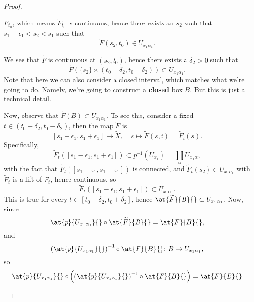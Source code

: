 \begin{proof}
\begin{enumerate}
		      \(F_{t_0}\), which means \(\widetilde{F} _{t_0}\) is continuous, hence there exists an \(s_{2} \) such that \(s_{1}-\epsilon _1<s_{2}< s_1  \) such that
		      \[
			      \widetilde{F} (s_2, t_0)\in U_{x_1 \alpha _1}.
		      \]
		      \begin{figure}[H]
			      \centering
			      \label{fig:pf:col:lec14-8}
		      \end{figure}
		      We see that \(\widetilde{F} \) is continuous at \((s_2, t_0)\), hence there exists a \(\delta _2>0\) such that
		      \[
			      \widetilde{F} \left(\{s_2\}\times (t_0 - \delta _2, t_0 + \delta_2)\right)\subset U_{x_1\alpha _1}.
		      \]
		      Note that here we can also consider a closed interval, which matches what we're going to do. Namely, we're going to construct a
		      \textbf{closed} box \(B\). But this is just a technical detail.
		      \begin{figure}[H]
			      \centering
			      \label{fig:pf:col:lec14-9}
		      \end{figure}
		      Now, observe that \(\widetilde{F} (B)\subset U_{x_1 \alpha _1}\). To see this, consider a fixed \(t\in (t_0 + \delta _2, t_0 - \delta _2)\), then the map \(\widetilde{F} \) is
		      \[
			      [s_{1}-\epsilon _1, s_{1}+\epsilon _1]\to \widetilde{X} ,\quad s\mapsto \widetilde{F} (s, t) = \widetilde{F} _{t} (s).
		      \]
		      Specifically,
		      \[
			      \widetilde{F} _{t} ([s_{1}-\epsilon _1, s_{1}+\epsilon _1]) \subset p^{-1} (U_{x_1}) = \coprod\limits_{\alpha}U_{x_1 \alpha },
		      \]
		      with the fact that \(\widetilde{F} _{t} ([s_{1}-\epsilon _1, s_{1}+\epsilon _1])\) is connected, and \(\widetilde{F} _{t} (s_2)\in U_{x_1 \alpha _1}\) with
		      \(\widetilde{F} _t\) is a \hyperref[prop:homotopy-lifting-property]{lift} of \(F_{t} \), hence continuous, so
		      \[
			      \widetilde{F} _{t} ([s_{1}-\epsilon _1, s_{1}+\epsilon _1])\subset U_{x_1 \alpha _1}.
		      \]
		      This is true for every \(t\in [t_0-\delta _2, t_0 + \delta _2]\), hence \(\at{\widetilde{F} }{B}{} \subset U_{x_1 \alpha _1}\). Now, since
		      \[
			      \at{p}{U_{x_1 \alpha _1}}{}\circ \at{\widetilde{F} }{B}{} = \at{F}{B}{},
		      \]
		      and
		      \[
			      \left(\at{p}{U_{x_1 \alpha _1}}{} \right)^{-1} \circ \at{F}{B}{} \colon B\to U_{x_1 \alpha _1},
		      \]
		      so
		      \[
			      \at{p}{U_{x_1 \alpha _1}}{} \circ \left(\left(\at{p}{U_{x_1 \alpha _1}}{} \right)^{-1} \circ \at{F}{B}{}\right) = \at{F}{B}{}
		      \]

\end{enumerate}
\end{proof}
